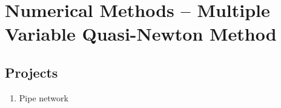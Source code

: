 \section{Numerical Methods -- Multiple Variable Quasi-Newton Method}
\subsection{Projects}
\begin{enumerate}
\item Pipe network
\end{enumerate}